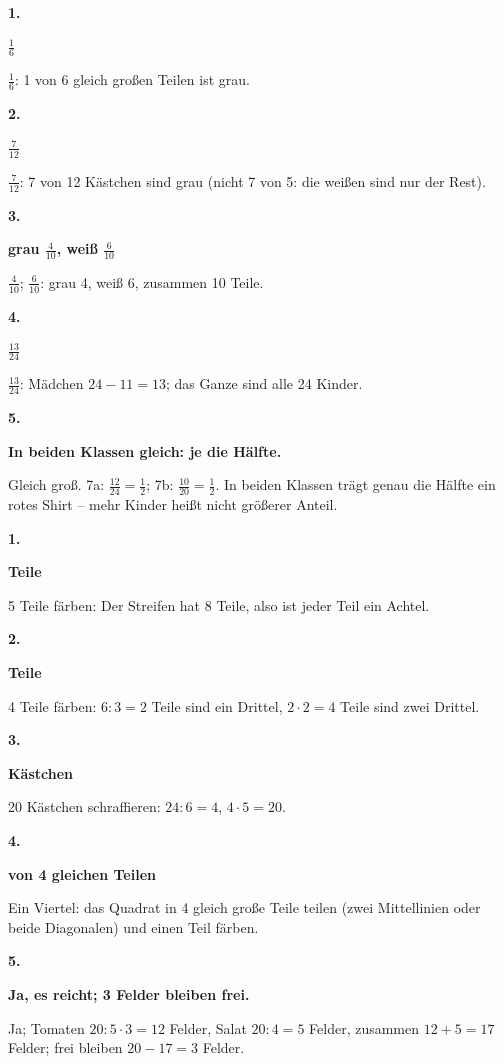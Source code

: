 \documentclass[11pt]{article}
\newcommand{\lsg}[3]{\par\noindent\begin{minipage}[t]{9mm}\textbf{#1}\end{minipage}%
  \begin{minipage}[t]{52mm}\raggedright\bfseries\boldmath #2\end{minipage}\hspace{3mm}%
  \begin{minipage}[t]{\dimexpr\linewidth-64mm\relax}\raggedright\small #3\end{minipage}\par\vspace{4pt}}
\begin{document}
\par\smallskip
{}\par
\par\Needspace{25mm}\vspace{6pt}\noindent\colorbox{black!12}{}\hspace{2mm}{\bfseries Anteil ablesen: Zähler und Nenner}\par\vspace{4pt}
\lsg{1.}{$\frac{1}{6}$}{$\frac{1}{6}$: 1 von 6 gleich großen Teilen ist grau.}
\lsg{2.}{$\frac{7}{12}$}{$\frac{7}{12}$: 7 von 12 Kästchen sind grau (nicht 7 von 5: die weißen sind nur der Rest).}
\lsg{3.}{grau $\frac{4}{10}$, weiß $\frac{6}{10}$}{$\frac{4}{10}$; $\frac{6}{10}$: grau 4, weiß 6, zusammen 10 Teile.}
\lsg{4.}{$\frac{13}{24}$}{$\frac{13}{24}$: Mädchen $24 - 11 = 13$; das Ganze sind alle 24 Kinder.}
\lsg{5.}{In beiden Klassen gleich: je die Hälfte.}{Gleich groß. 7a: $\frac{12}{24} = \frac{1}{2}$; 7b: $\frac{10}{20} = \frac{1}{2}$. In beiden Klassen trägt genau die Hälfte ein rotes Shirt – mehr Kinder heißt nicht größerer Anteil.}
\par\Needspace{25mm}\vspace{6pt}\noindent\colorbox{black!12}{}\hspace{2mm}{\bfseries Anteil einzeichnen}\par\vspace{4pt}
\lsg{1.}{5 Teile}{5 Teile färben: Der Streifen hat 8 Teile, also ist jeder Teil ein Achtel.}
\lsg{2.}{4 Teile}{4 Teile färben: $6 : 3 = 2$ Teile sind ein Drittel, $2 \cdot 2 = 4$ Teile sind zwei Drittel.}
\lsg{3.}{20 Kästchen}{20 Kästchen schraffieren: $24 : 6 = 4$, $4 \cdot 5 = 20$.}
\lsg{4.}{1 von 4 gleichen Teilen}{Ein Viertel: das Quadrat in 4 gleich große Teile teilen (zwei Mittellinien oder beide Diagonalen) und einen Teil färben.}
\lsg{5.}{Ja, es reicht; 3 Felder bleiben frei.}{Ja; Tomaten $20 : 5 \cdot 3 = 12$ Felder, Salat $20 : 4 = 5$ Felder, zusammen $12 + 5 = 17$ Felder; frei bleiben $20 - 17 = 3$ Felder.}
\par\Needspace{25mm}\vspace{6pt}\noindent\colorbox{black!12}{}\hspace{2mm}{\bfseries Ungleiche Teile: erst gleich groß machen}\par\vspace{4pt}
\end{document}
